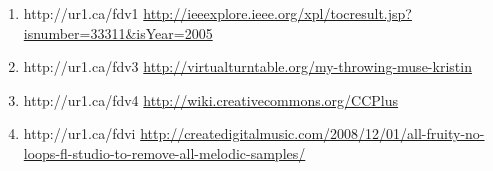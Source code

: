\begin{enumerate}
    \item{http://ur1.ca/fdv1}
        \url{http://ieeexplore.ieee.org/xpl/tocresult.jsp?isnumber=33311&isYear=2005}

    \item{http://ur1.ca/fdv3}
        \url{http://virtualturntable.org/my-throwing-muse-kristin}

    \item{http://ur1.ca/fdv4}
        \url{http://wiki.creativecommons.org/CCPlus}

    \item{http://ur1.ca/fdvi}
        \url{http://createdigitalmusic.com/2008/12/01/all-fruity-no-loops-fl-studio-to-remove-all-melodic-samples/}
\end{enumerate}
